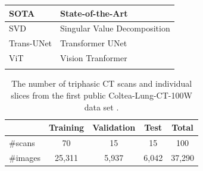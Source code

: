 \documentclass[10pt,journal,compsoc]{IEEEtran}
\begin{document}
\begin{table}[]
{\begin{tabular}{ll}
\multicolumn{1}{|l|}{SOTA}             & \multicolumn{1}{l|}{State-of-the-Art}             \\ \hline
\multicolumn{1}{|l|}{SVD}              & \multicolumn{1}{l|}{Singular Value Decomposition} \\ \hline
\multicolumn{1}{|l|}{Trans-UNet}       & \multicolumn{1}{l|}{Transformer UNet}             \\ \hline
\multicolumn{1}{|l|}{ViT}              & \multicolumn{1}{l|}{Vision Tranformer}            \\ \hline
                                       &                                                  
\end{tabular}%
}
\end{table}

\begin{table}


\centering
\begin{tabular}{|l|ccc|c|}

\hline
       & Training  & Validation    & Test      & Total\\ 
\hline
\hline
\#scans     & 70        & 15            & 15        & 100 \\ 
\hline
\#images    & 25,311     & 5,937        & 6,042      & 37,290 \\ 
\hline
\end{tabular}%
\caption{The number of triphasic CT scans and individual slices from the first public Coltea-Lung-CT-100W data set \cite{ristea2021cytran}.}
\label{tab_dataset}
\end{table}
\end{document}

